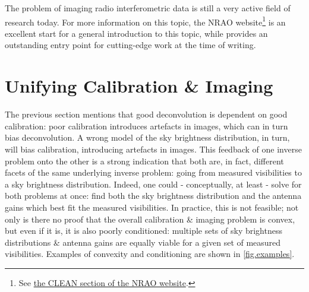 \pg
The problem of imaging radio interferometric data is still a very active field of research today. For more information on this topic, the NRAO website\footnote{See \href{https://www.cv.nrao.edu/~abridle/deconvol/node8.html\#SECTION00051000000000000000}{the CLEAN section of the NRAO website}.} is an excellent start for a general introduction to this topic, while \citet{2017arXiv171202078T} provides an outstanding entry point for cutting-edge work at the time of writing.

\section{Unifying Calibration \& Imaging}\label{sec.CalibImagery}

\pg
The previous section mentions that good deconvolution is dependent on good calibration: poor calibration introduces artefacts in images, which can in turn bias deconvolution. A wrong model of the sky brightness distribution, in turn, will bias calibration, introducing artefacts in images. This feedback of one inverse problem onto the other is a strong indication that both are, in fact, different facets of the same underlying inverse problem: going from measured visibilities to a sky brightness distribution. Indeed, one could - conceptually, at least - solve for both problems at once: find both the sky brightness distribution and the antenna gains which best fit the measured visibilities. In practice, this is not feasible; not only is there no proof that the overall calibration \& imaging problem is convex, but even if it is, it is also poorly conditioned: multiple sets of sky brightness distributions \& antenna gains are equally viable for a given set of measured visibilities. Examples of convexity and conditioning are shown in \cref{fig.examples}.

